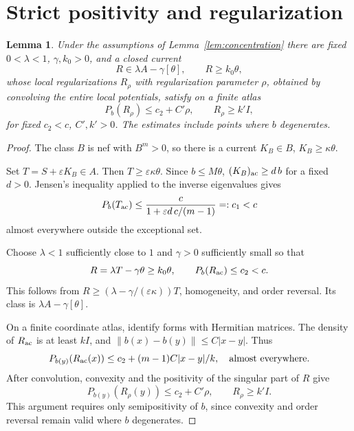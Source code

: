 \documentclass[reqno]{amsart}
\theoremstyle{remark}
\theoremstyle{plain}
\newtheorem{lemma}[thm]{Lemma}
\begin{document}
\section{Strict positivity and regularization}


\begin{samepage}
\begin{lemma}\label{lem:strict-current}
Under the assumptions of Lemma~\ref{lem:concentration} there are fixed \(0<\lambda<1\), \(\gamma,k_0>0\), and a closed current
\[
R\in\lambda A-\gamma[\theta],\qquad R\ge k_0\theta,
\]
whose local regularizations $R_\rho$ with regularization parameter $\rho$, obtained by convolving the entire local potentials, satisfy on a finite atlas
\begin{equation}\label{eq:strict-regularization}
P_b(R_\rho)\le c_2+C'\rho,\qquad R_\rho\ge k'I,
\end{equation}
for fixed \(c_2<c\), \(C',k'>0\). The estimates include points where \(b\) degenerates.
\end{lemma}
\end{samepage}

\begin{proof}
The class \(B\) is nef with \(B^m>0\), so there is a current \(K_B\in B\), \(K_B\ge\kappa\theta\).

Set \(T=S+\varepsilon K_B\in A\). Then \(T\ge\varepsilon\kappa\theta\). Since \(b\le M\theta\),  \((K_B)_{\rm ac}\geq d\,b\)  for a fixed \(d>0\). Jensen's inequality applied to the inverse eigenvalues gives
\begin{equation}\label{eq:strict-margin}
P_b(T_{\rm ac})\le
\frac{c}{1+\varepsilon d\,c/(m-1)}=:c_1<c
\end{equation}
almost everywhere outside the exceptional set.  

Choose \(\lambda<1\) sufficiently close to $1$ and \(\gamma>0\) sufficiently small so that
\[
R=\lambda T-\gamma\theta\ge k_0\theta,\qquad
P_b(R_{\rm ac})\le c_2<c.
\]
This follows from \(R\ge(\lambda-\gamma/(\varepsilon\kappa))T\), homogeneity, and order reversal. Its class is \(\lambda A-\gamma[\theta]\).

On a finite coordinate atlas, identify forms with Hermitian matrices. The density of \(R_{\rm ac}\) is at least \(kI\), and
\(\|b(x)-b(y)\|\le C|x-y|\). Thus
\[
P_{b(y)}(R_{\rm ac}(x))
\le c_2+(m-1)C|x-y|/k, \quad \text{almost everywhere.}
\]
After convolution, convexity and the positivity of the singular part of $R$ give
\begin{equation}\label{eq:convolution}
P_{b(y)}(R_\rho(y))\le c_2+C'\rho,\qquad
R_\rho\ge k'I.
\end{equation}
This argument requires only semipositivity of \(b\), since convexity and order reversal remain valid where \(b\) degenerates.
\end{proof}
\end{document}
